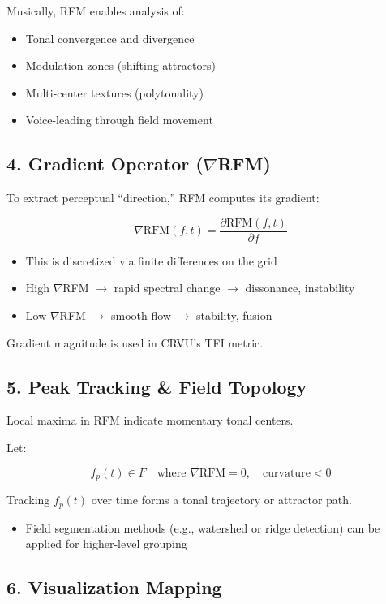 \documentclass{article}
\begin{document}
Musically, RFM enables analysis of:

\begin{itemize}
    \item Tonal convergence and divergence
    \item Modulation zones (shifting attractors)
    \item Multi-center textures (polytonality)
    \item Voice-leading through field movement
\end{itemize}

\subsection*{4. Gradient Operator ($\nabla$RFM)}

To extract perceptual “direction,” RFM computes its gradient:

\[
\nabla \text{RFM}(f, t) = \frac{\partial \text{RFM}(f, t)}{\partial f}
\]

\begin{itemize}
    \item This is discretized via finite differences on the grid
    \item High $\nabla$RFM $\rightarrow$ rapid spectral change $\rightarrow$ dissonance, instability
    \item Low $\nabla$RFM $\rightarrow$ smooth flow $\rightarrow$ stability, fusion
\end{itemize}

Gradient magnitude is used in CRVU’s TFI metric.

\subsection*{5. Peak Tracking \& Field Topology}

Local maxima in RFM indicate momentary tonal centers.

Let:

\[
f_p(t) \in F \quad \text{where } \nabla \text{RFM} = 0, \quad \text{curvature} < 0
\]

Tracking $f_p(t)$ over time forms a tonal trajectory or attractor path.

\begin{itemize}
    \item Field segmentation methods (e.g., watershed or ridge detection) can be applied for higher-level grouping
\end{itemize}

\subsection*{6. Visualization Mapping}
\end{document}
